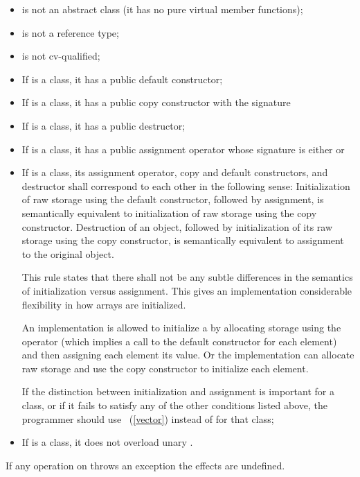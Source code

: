 \begin{itemize}
\item {} is not an abstract class (it has no pure virtual member functions);
\item {} is not a reference type;
\item {} is not cv-qualified;
\item If  is a class, it has a public default constructor;
\item If  is a class, it has a public copy constructor with the signature 
\item If  is a class, it has a public destructor;
\item If  is a class, it has a public assignment operator whose signature is either
or
\item If  is a class, its assignment operator, copy and default constructors,
and destructor shall correspond to each other in the following sense:
Initialization of raw storage using the default constructor, followed by
assignment, is semantically equivalent to initialization of raw
storage using the copy constructor.
Destruction of an object, followed by
initialization of its raw storage using the copy constructor,
is semantically equivalent to assignment to the original object.

\enternote
This rule states that there shall not be any subtle differences in the semantics
of initialization versus assignment.
This gives an implementation
considerable flexibility in how arrays are initialized.

\enterexample
An implementation is allowed to initialize a
by allocating storage using the
operator (which
implies a call to the default constructor for each element) and then
assigning each element its value.
Or the implementation can allocate raw
storage and use the copy constructor to initialize each element.
\exitexample

If the distinction between initialization and assignment is important
for a class, or if it fails to satisfy any of
the other conditions listed above, the programmer should use
~(\ref{vector}) instead of
for that class;
\exitnote
\item If  is a class, it does not overload unary
.
\end{itemize}

\pnum
If any operation on 
throws an exception the effects are undefined.

